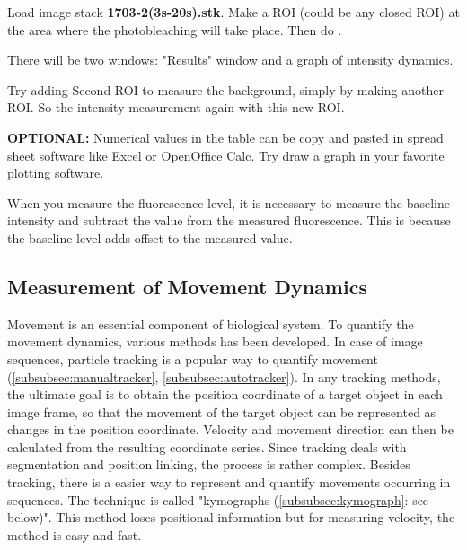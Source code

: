 \begin{indentexercise}{1}
Load image stack \textbf{1703-2(3s-20s).stk}. 
Make a ROI (could be any closed ROI) at the area where the photobleaching will take place. 
Then do . 

There will be two windows: "Results" window and a graph of intensity dynamics. 

Try adding Second ROI to measure the background, simply by making another ROI. So the intensity measurement again with this new ROI. 

\textbf{OPTIONAL:} Numerical values in the table can be copy and pasted in spread sheet software like Excel or OpenOffice Calc. Try draw a graph in your favorite plotting software.
\end{indentexercise}

When you measure the fluorescence level, it is necessary to measure the
baseline intensity and subtract the value from the measured
fluorescence. This is because the baseline level adds offset to the
measured value.

\subsection{Measurement of Movement Dynamics}

Movement is an essential component of biological system. To quantify the
movement dynamics, various methods has been developed. In case of image
sequences, particle tracking is a popular way to quantify movement
(\ref{subsubsec:manualtracker}, \ref{subsubsec:autotracker}). 
In any tracking methods, the ultimate goal is to obtain
the position coordinate of a target object in each image frame, so that
the movement of the target object can be represented as changes in the
position coordinate. Velocity and movement direction can then be
calculated from the resulting coordinate series. Since tracking deals
with segmentation and position linking, the process is rather complex.
Besides tracking, there is a easier way to represent and quantify
movements occurring in sequences. The technique is called
"kymographs (\ref{subsubsec:kymograph}: see below)".
This method loses positional information but for measuring velocity,
the method is easy and fast. \\ 


